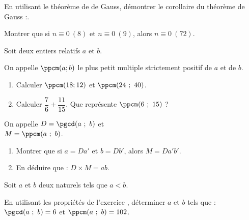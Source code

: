 \documentclass{cornouaille}
\begin{document}
\begin{colonne*exercice}
\begin{exercice}
En utilisant le théorème de de Gauss, démontrer le corollaire du théorème de Gauss :.
\end{exercice}

\begin{exercice}
  Montrer que si $n\equiv0~(8)$ et $n\equiv0~(9)$, alors
  $n\equiv0~(72)$.
\end{exercice}

\begin{exercice}
  Soit deux entiers relatifs $a$ et $b$. 
  
  On appelle $\ppcm(a; b)$ le plus petit multiple strictement positif
  de $a$ et de $b$.
\begin{enumerate}
\item Calculer $\ppcm(18; 12)$ et $\ppcm(24\ ;\ 40)$.\vspace{5pt}
\item Calculer $\dfrac{7}{6}+\dfrac{11}{15}$. Que représente
  $\ppcm(6\ ;\ 15)$ ?
\end{enumerate}
\end{exercice}

\begin{exercice}\label{ExoPPCM}
On appelle $D = \pgcd(a\ ;\ b)$ et\\ $M = \ppcm(a\ ;\ b)$.
\begin{enumerate}
\item Montrer que si $a = Da'$ et $b = Db'$, alors $M = Da'b'$.
\item En déduire que : $D\times M = ab$.
\end{enumerate}
\end{exercice}

\begin{exercice}
Soit $a$ et $b$ deux naturels tels que $a < b$.

En utilisant les propriétés de l’exercice ,
déterminer $a$ et $b$ tels que : $\pgcd(a\ ;\ b)=6$ et
$\ppcm(a\ ;\ b)=102$.
\end{exercice}



\end{colonne*exercice}
\end{document}
